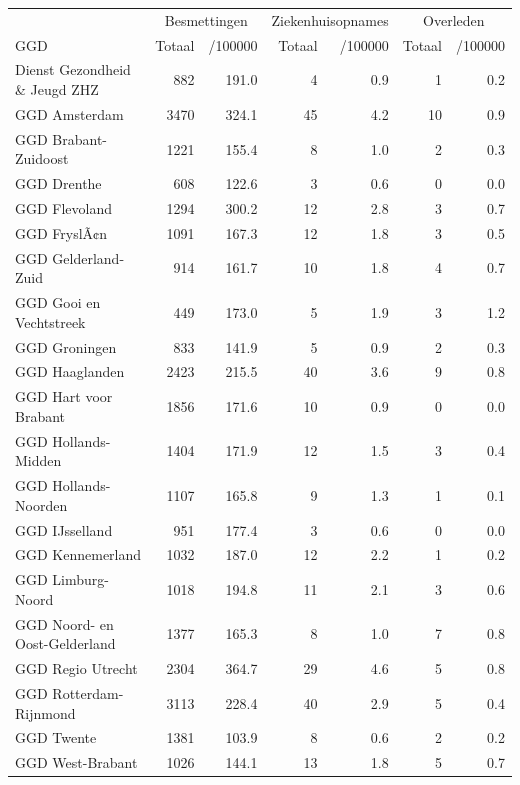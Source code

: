\documentclass[
  english,
  man,floatsintext]{apa6}
\begin{document}
\begin{table}
\centering\begingroup\fontsize{10}{12}\selectfont

\begin{threeparttable}
\begin{tabular}{lrrrrrr}
\toprule
\multicolumn{1}{c}{ } & \multicolumn{2}{c}{Besmettingen} & \multicolumn{2}{c}{Ziekenhuisopnames} & \multicolumn{2}{c}{Overleden} \\
\cmidrule(l{3pt}r{3pt}){2-3} \cmidrule(l{3pt}r{3pt}){4-5} \cmidrule(l{3pt}r{3pt}){6-7}
GGD & Totaal & /100000 & Totaal & /100000 & Totaal & /100000\\
\midrule
Dienst Gezondheid \& Jeugd ZHZ & 882 & 191.0 & 4 & 0.9 & 1 & 0.2\\
GGD Amsterdam & 3470 & 324.1 & 45 & 4.2 & 10 & 0.9\\
GGD Brabant-Zuidoost & 1221 & 155.4 & 8 & 1.0 & 2 & 0.3\\
GGD Drenthe & 608 & 122.6 & 3 & 0.6 & 0 & 0.0\\
GGD Flevoland & 1294 & 300.2 & 12 & 2.8 & 3 & 0.7\\
GGD FryslÃ¢n & 1091 & 167.3 & 12 & 1.8 & 3 & 0.5\\
GGD Gelderland-Zuid & 914 & 161.7 & 10 & 1.8 & 4 & 0.7\\
GGD Gooi en Vechtstreek & 449 & 173.0 & 5 & 1.9 & 3 & 1.2\\
GGD Groningen & 833 & 141.9 & 5 & 0.9 & 2 & 0.3\\
GGD Haaglanden & 2423 & 215.5 & 40 & 3.6 & 9 & 0.8\\
GGD Hart voor Brabant & 1856 & 171.6 & 10 & 0.9 & 0 & 0.0\\
GGD Hollands-Midden & 1404 & 171.9 & 12 & 1.5 & 3 & 0.4\\
GGD Hollands-Noorden & 1107 & 165.8 & 9 & 1.3 & 1 & 0.1\\
GGD IJsselland & 951 & 177.4 & 3 & 0.6 & 0 & 0.0\\
GGD Kennemerland & 1032 & 187.0 & 12 & 2.2 & 1 & 0.2\\
GGD Limburg-Noord & 1018 & 194.8 & 11 & 2.1 & 3 & 0.6\\
GGD Noord- en Oost-Gelderland & 1377 & 165.3 & 8 & 1.0 & 7 & 0.8\\
GGD Regio Utrecht & 2304 & 364.7 & 29 & 4.6 & 5 & 0.8\\
GGD Rotterdam-Rijnmond & 3113 & 228.4 & 40 & 2.9 & 5 & 0.4\\
GGD Twente & 1381 & 103.9 & 8 & 0.6 & 2 & 0.2\\
GGD West-Brabant & 1026 & 144.1 & 13 & 1.8 & 5 & 0.7\\

\end{tabular}
\end{threeparttable}
\end{table}
\end{document}
